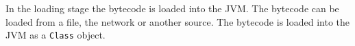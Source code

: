 In the loading stage the bytecode is loaded into the JVM. The bytecode can be loaded from a file, the network or another source. The bytecode is loaded into the JVM as a \texttt{Class} object.















